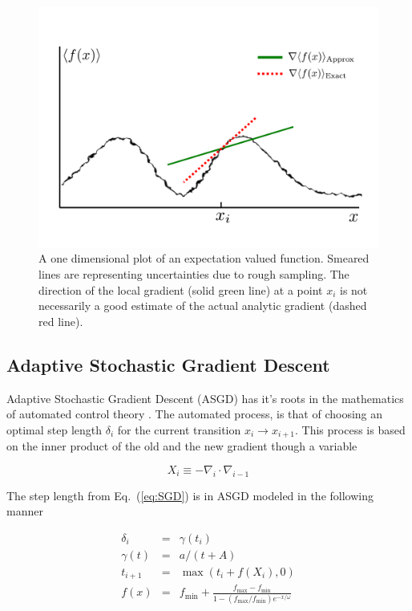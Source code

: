 \begin{figure}
 \begin{center}
  \includegraphics[scale=0.3]{../Graphics/SSGD.pdf}
  \caption{A one dimensional plot of an expectation valued function. Smeared lines are representing uncertainties due to rough sampling. The direction of the local gradient (solid green line) at a point $x_i$ is not necessarily a good estimate of the actual analytic gradient (dashed red line).}
  \label{fig:sSGD}
 \end{center}
\end{figure}


\subsection{Adaptive Stochastic Gradient Descent}

Adaptive Stochastic Gradient Descent (ASGD) has it's roots in the mathematics of automated control theory \cite{ASGD_MB}. The automated process, is that of choosing an optimal step length $\delta_i$ for the current transition $x_{i}\to x_{i+1}$. This process is based on the inner product of the old and the new gradient though a variable 

\begin{equation}
\label{eq:ASGD_X_i}
 X_i \equiv -\nabla_i\cdot \nabla_{i-1}
\end{equation}

The step length from Eq.~(\ref{eq:SGD}) is in ASGD modeled in the following manner

\begin{eqnarray}
 \delta_i   &=& \gamma(t_i) \\
 \gamma(t)  &=& a/(t + A) \label{eq:ASGD_delta_i}\\
 t_{i+1}    &=& \max(t_i + f(X_i), 0) \label{eq:ASGD_t_i}\\
 f(x)       &=& f_\mathrm{min} + \frac{f_\mathrm{max} - f_\mathrm{min}}{1 - (f_\mathrm{max}/f_\mathrm{min})e^{-x/\omega}}\label{eq:ASGD_f_i}
\end{eqnarray}

